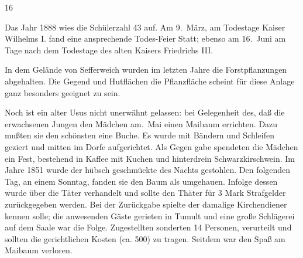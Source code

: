 

%
                16

\pend
{}
\pstart

Das Jahr 1888 wies die Schülerzahl 43 auf.\ob
Am 9.\ März, am Todestage Kaiser Wilhelms I. fand\ob
eine ansprechende Todes-Feier Statt; ebenso am 16.\ Juni\ob
am Tage nach dem Todestage des alten Kaisers\ob
Friedrichs III.

In dem Gelände von Sefferweich wurden im letzten\ob
Jahre die Forstpflanzungen abgehalten. Die Gegend und\ob
Hutflächen die Pflanzfläche scheint für diese Anlage\ob
ganz besonders geeignet zu sein.

Noch ist ein alter Usus nicht unerwähnt gelassen: bei Gelegenheit\ob
des\unsicher, daß die erwachsenen Jungen den Mädchen am.\ Mai einen Maibaum errichten. Dazu mußten sie den\ob
{}%
schönsten eine Buche. Es wurde mit Bändern und Schleifen\ob
geziert und mitten im Dorfe aufgerichtet. Als Gegen\ohb
gabe spendeten die Mädchen ein Fest, bestehend in\ob
Kaffee mit Kuchen und hinterdrein Schwarzkirschwein.\ob
Im Jahre 1851 wurde der hübsch geschmückte des Nachts\ob
gestohlen. Den folgenden Tag, an einem Sonntag,\ob
fanden sie den Baum als umgehauen. Infolge dessen\ob
wurde über die Täter verhandelt und sollte den\ob
Thäter für 3 Mark Strafgelder zurückgegeben werden. Bei\ob
der Zurückgabe spielte der damalige Kirchendiener kennen\ob
solle; die anwesenden Gäste gerieten in Tumult\ob
und eine große Schlägerei auf dem Saale war die Folge.\ob
Zugestellten sonderten 14 Personen, verurteilt und sollten die\ob
gerichtlichen Kosten (ca. 500) zu tragen. Seitdem war\ob
den Spaß am Maibaum verloren.
\pend
